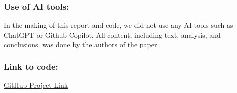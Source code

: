\documentclass[11pt]{article}
\begin{document}
\begin{titlepage}
\subsubsection*{Use of AI tools:} 
In the making of this report and code, we did not use any AI tools such as ChatGPT or Github Copilot. All content, including text, analysis, and conclusions, was done by the authors of the paper.
\\
\subsubsection*{Link to code:} 
\href{https://github.com/xchanti124/ml-malware-detection.git}{GitHub Project Link}


\end{titlepage}
\end{document}
